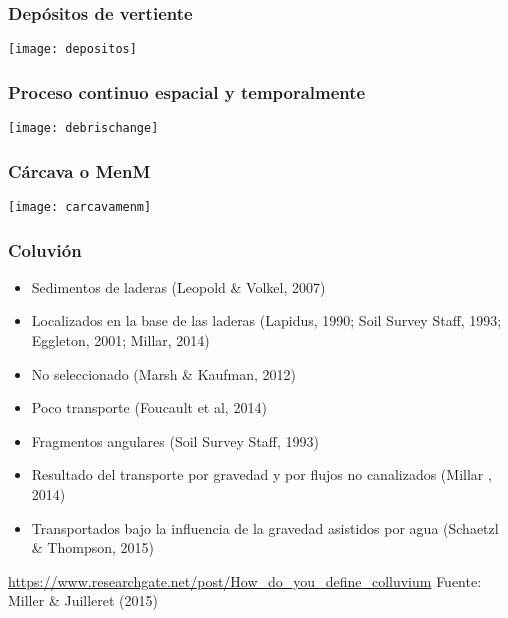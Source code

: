 \documentclass{beamer}
\begin{document}
\begin{frame}
\frametitle{Depósitos de vertiente}
\begin{center}
   	\texttt{[image: depositos]}
\end{center}
\end{frame}
\begin{frame}
\frametitle{Proceso continuo espacial y temporalmente}
\begin{center}
   	\texttt{[image: debrischange]}
\end{center}
\end{frame}
\begin{frame}
\frametitle{Cárcava o MenM}
\begin{center}
   	\texttt{[image: carcavamenm]}
\end{center}
\end{frame}
\begin{frame}
\frametitle{Coluvión}
\begin{itemize}
\item Sedimentos de laderas (Leopold \& Volkel, 2007)
\item Localizados en la base de las laderas (Lapidus, 1990; Soil Survey Staff, 1993; Eggleton, 2001; Millar, 2014)
\item No seleccionado (Marsh \& Kaufman, 2012)
\item Poco transporte (Foucault et al, 2014)
\item Fragmentos angulares (Soil Survey Staff, 1993)
\item Resultado del transporte por gravedad y por flujos no canalizados (Millar , 2014)
\item Transportados bajo la influencia de la gravedad asistidos por agua (Schaetzl \& Thompson, 2015)
\end{itemize}
\vfill
\tiny{\url{https://www.researchgate.net/post/How_do_you_define_colluvium}}
\tiny{Fuente: Miller \& Juilleret (2015)}
\end{frame}
\end{document}
